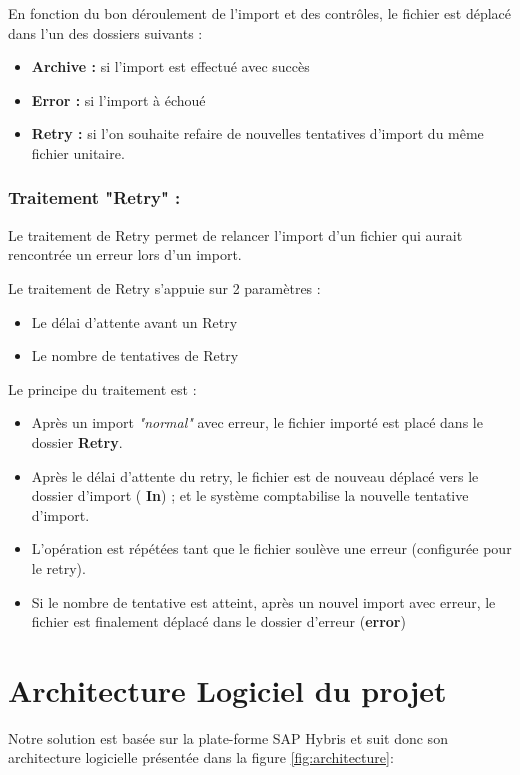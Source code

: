 En fonction du bon déroulement de l'import et des contrôles, le fichier est déplacé dans l'un des dossiers suivants :

\begin{itemize}
\medskip
    \item \textbf{Archive :} si l'import est effectué avec succès
    \smallskip
    \item \textbf{Error :} si l'import à échoué
    \smallskip
    \item \textbf{Retry :} si l'on souhaite refaire de nouvelles tentatives d'import du même fichier unitaire.
\end{itemize}

\subsubsection{Traitement "Retry" :}

Le traitement de Retry permet de relancer l'import d'un fichier qui aurait rencontrée un erreur lors d'un import.

\medskip

Le traitement de Retry s'appuie sur 2 paramètres :
\begin{itemize}
\medskip
    \item Le délai d'attente avant un Retry
    \smallskip
    \item Le nombre de tentatives de Retry
\end{itemize}
\medskip
Le principe du traitement est :
\medskip
\begin{itemize}
    \item Après un import \textit{"normal"} avec erreur, le fichier importé est placé dans le dossier \textbf{Retry}.
    \smallskip
    \item Après le délai d'attente du retry, le fichier est de nouveau déplacé vers le dossier d'import ( \textbf{In}) ; et le système comptabilise la nouvelle tentative d'import.
    \smallskip
    \item L'opération est répétées tant que le fichier soulève une erreur (configurée pour le retry).
    \smallskip
    \item Si le nombre de tentative est atteint, après un nouvel import avec erreur, le fichier est finalement déplacé dans le dossier d'erreur (\textbf{error})
\end{itemize}
\clearpage
\section{Architecture Logiciel du projet}
Notre solution est basée sur la plate-forme SAP Hybris et suit donc son architecture logicielle présentée dans la figure \ref{fig:architecture}:


